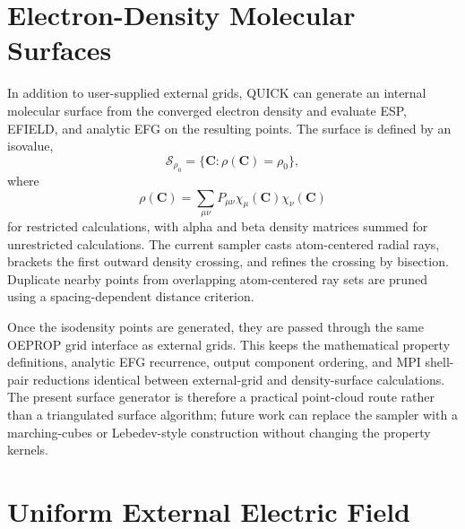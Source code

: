 \documentclass[journal=jcisd8,manuscript=article]{achemso}
\begin{document}
\section{Electron-Density Molecular Surfaces}

In addition to user-supplied external grids, QUICK can generate an internal molecular surface from the converged electron density and evaluate ESP, EFIELD, and analytic EFG on the resulting points.  The surface is defined by an isovalue,
\begin{equation}
  \mathcal{S}_{\rho_0} =
  \{\mathbf{C}: \rho(\mathbf{C})=\rho_0\},
\end{equation}
where
\begin{equation}
  \rho(\mathbf{C}) =
  \sum_{\mu\nu} P_{\mu\nu}\chi_\mu(\mathbf{C})\chi_\nu(\mathbf{C})
\end{equation}
for restricted calculations, with alpha and beta density matrices summed for unrestricted calculations.  The current sampler casts atom-centered radial rays, brackets the first outward density crossing, and refines the crossing by bisection.  Duplicate nearby points from overlapping atom-centered ray sets are pruned using a spacing-dependent distance criterion.

Once the isodensity points are generated, they are passed through the same OEPROP grid interface as external grids.  This keeps the mathematical property definitions, analytic EFG recurrence, output component ordering, and MPI shell-pair reductions identical between external-grid and density-surface calculations.  The present surface generator is therefore a practical point-cloud route rather than a triangulated surface algorithm; future work can replace the sampler with a marching-cubes or Lebedev-style construction without changing the property kernels.

\section{Uniform External Electric Field}
\end{document}

